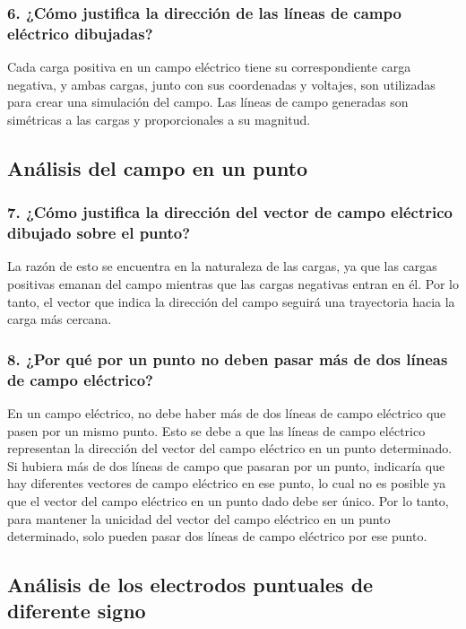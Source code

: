 \documentclass[letterpaper, 12pt]{report}
\begin{document}
\subsubsection{6. ¿Cómo justifica la dirección de las líneas de campo
	eléctrico dibujadas?}

Cada carga positiva en un campo eléctrico tiene su
correspondiente carga negativa, y ambas cargas, junto con
sus coordenadas y voltajes, son utilizadas para crear una
simulación del campo. Las líneas de campo generadas son
simétricas a las cargas y proporcionales a su magnitud.

\subsection{Análisis del campo en un punto}

\subsubsection{7. ¿Cómo justifica la dirección del vector de campo eléctrico
	dibujado sobre el punto?}

La razón de esto se encuentra en la naturaleza de las
cargas, ya que las cargas positivas emanan del campo
mientras que las cargas negativas entran en él. Por lo
tanto, el vector que indica la dirección del campo seguirá
una trayectoria hacia la carga más cercana.

\subsubsection{8. ¿Por qué por un punto no deben pasar más de dos líneas
	de campo eléctrico?}

En un campo eléctrico, no debe haber más de dos líneas de
campo eléctrico que pasen por un mismo punto. Esto se debe
a que las líneas de campo eléctrico representan la
dirección del vector del campo eléctrico en un punto
determinado. Si hubiera más de dos líneas de campo que
pasaran por un punto, indicaría que hay diferentes vectores
de campo eléctrico en ese punto, lo cual no es posible ya
que el vector del campo eléctrico en un punto dado debe ser
único. Por lo tanto, para mantener la unicidad del vector
del campo eléctrico en un punto determinado, solo pueden
pasar dos líneas de campo eléctrico por ese punto.

\subsection{Análisis de los electrodos puntuales de diferente signo}
\end{document}
